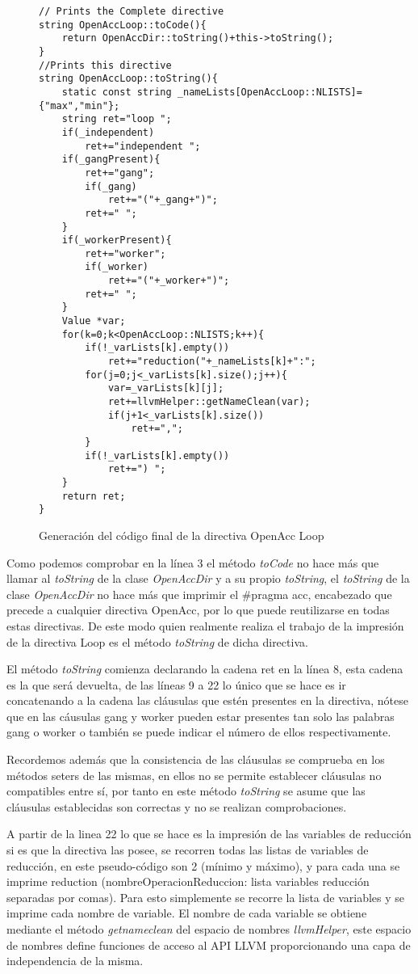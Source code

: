 \begin{figure}[tph]
\begin{lstlisting}
// Prints the Complete directive
string OpenAccLoop::toCode(){
	return OpenAccDir::toString()+this->toString();
}
//Prints this directive
string OpenAccLoop::toString(){
	static const string _nameLists[OpenAccLoop::NLISTS]= {"max","min"};
	string ret="loop ";
	if(_independent)
		ret+="independent ";
	if(_gangPresent){
		ret+="gang";
		if(_gang)
			ret+="("+_gang+")";
		ret+=" ";
	}
	if(_workerPresent){
		ret+="worker";
		if(_worker)
			ret+="("+_worker+")";
		ret+=" ";
	}
	Value *var;
	for(k=0;k<OpenAccLoop::NLISTS;k++){
		if(!_varLists[k].empty())
			ret+="reduction("+_nameLists[k]+":";
		for(j=0;j<_varLists[k].size();j++){
			var=_varLists[k][j];
			ret+=llvmHelper::getNameClean(var);
			if(j+1<_varLists[k].size())
				ret+=",";
		}
		if(!_varLists[k].empty())
			ret+=") ";
	}
	return ret;
}

\end{lstlisting}
\caption{Generación del código final de la directiva OpenAcc Loop}
\label{FIG:LoopToCode}
\end{figure}


Como podemos comprobar en la línea 3 el método \textit{toCode} no hace más que llamar al \textit{toString} de la clase \textit{OpenAccDir} y a su propio \textit{toString}, el \textit{toString} de la clase \textit{OpenAccDir} no hace más que imprimir el \#pragma acc, encabezado que precede a cualquier directiva OpenAcc, por lo que puede reutilizarse en todas estas directivas. De este modo quien realmente realiza el trabajo de la impresión de la directiva Loop es el método \textit{toString} de dicha directiva.

El método \textit{toString} comienza declarando la cadena ret en la línea 8, esta cadena es la que será devuelta, de las líneas 9 a 22 lo único que se hace es ir concatenando a la cadena las cláusulas que estén presentes en la directiva, nótese que en las cáusulas gang y worker pueden estar presentes tan solo las palabras gang o worker o también se puede indicar el número de ellos respectivamente.

Recordemos además que la consistencia de las cláusulas se comprueba en los métodos seters de las mismas, en ellos no se permite establecer cláusulas no compatibles entre sí, por tanto en este método \textit{toString} se asume que las cláusulas establecidas son correctas y no se realizan comprobaciones.

A partir de la linea 22 lo que se hace es la impresión de las variables de reducción si es que la directiva las posee, se recorren todas las listas de variables de reducción, en este pseudo-código son 2 (mínimo y máximo), y para cada una se imprime reduction (nombreOperacionReduccion: lista variables reducción separadas por comas). Para esto simplemente se recorre la lista de variables y se imprime cada nombre de variable. El nombre de cada variable se obtiene mediante el método \textit{getnameclean} del espacio de nombres \textit{llvmHelper}, este espacio de nombres define funciones de acceso al API LLVM proporcionando una capa de independencia de la misma.

